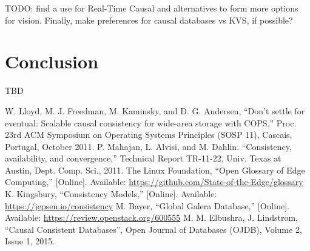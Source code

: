 \documentclass[conference]{IEEEtran}
\begin{document}
TODO: find a use for Real-Time Causal and \cite{b6} alternatives to form more
options for vision. Finally, make preferences for causal databases vs KVS, if
possible?

\section{Conclusion}

TBD

\begin{thebibliography}{00}
 W. Lloyd, M. J. Freedman, M. Kaminsky, and D. G. Andersen, ``Don’t settle for eventual: Scalable causal consistency for wide-area storage with COPS,'' Proc. 23rd ACM Symposium on Operating Systems Principles (SOSP 11), Cascais, Portugal, October 2011.
 P. Mahajan, L. Alvisi, and M. Dahlin. ``Consistency, availability, and convergence,'' Technical Report TR-11-22, Univ. Texas at Austin, Dept. Comp. Sci., 2011.
 The Linux Foundation, ``Open Glossary of Edge Computing,'' [Online]. Available: \url{https://github.com/State-of-the-Edge/glossary}
 K. Kingsbury, ``Consistency Models,'' [Online]. Available: \url{https://jepsen.io/consistency}
 M. Bayer, ``Global Galera Database,'' [Online]. Available: \url{https://review.openstack.org/600555}
 M. M. Elbushra, J. Lindstrom, ``Causal Consistent Databases'', Open Journal of Databases (OJDB), Volume 2, Issue 1, 2015.
\end{thebibliography}
\end{document}
